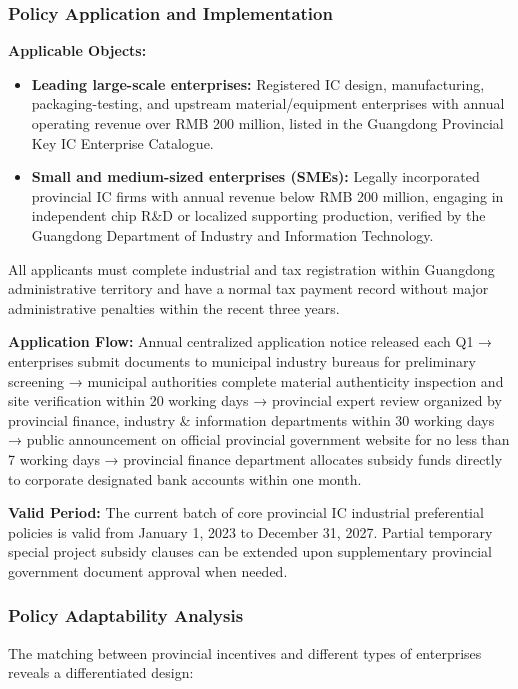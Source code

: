 \documentclass[12pt,a4paper]{article}
\begin{document}
\subsubsection{Policy Application and Implementation}

\textbf{Applicable Objects:}
\begin{itemize}
    \item \textbf{Leading large-scale enterprises:} Registered IC design,
          manufacturing, packaging-testing, and upstream material/equipment
          enterprises with annual operating revenue over RMB 200 million,
          listed in the Guangdong Provincial Key IC Enterprise Catalogue.
    \item \textbf{Small and medium-sized enterprises (SMEs):} Legally
          incorporated provincial IC firms with annual revenue below
          RMB 200 million, engaging in independent chip R\&D or localized
          supporting production, verified by the Guangdong Department of
          Industry and Information Technology.
\end{itemize}
All applicants must complete industrial and tax registration within
Guangdong administrative territory and have a normal tax payment record
without major administrative penalties within the recent three years.

\textbf{Application Flow:} Annual centralized application notice released
each Q1 → enterprises submit documents to municipal industry bureaus for
preliminary screening → municipal authorities complete material
authenticity inspection and site verification within 20 working days →
provincial expert review organized by provincial finance, industry \&
information departments within 30 working days → public announcement on
official provincial government website for no less than 7 working days →
provincial finance department allocates subsidy funds directly to
corporate designated bank accounts within one month.

\textbf{Valid Period:} The current batch of core provincial IC industrial
preferential policies is valid from January 1, 2023 to December 31, 2027.
Partial temporary special project subsidy clauses can be extended upon
supplementary provincial government document approval when needed.

\subsubsection{Policy Adaptability Analysis}

The matching between provincial incentives and different types of
enterprises reveals a differentiated design:
\end{document}
